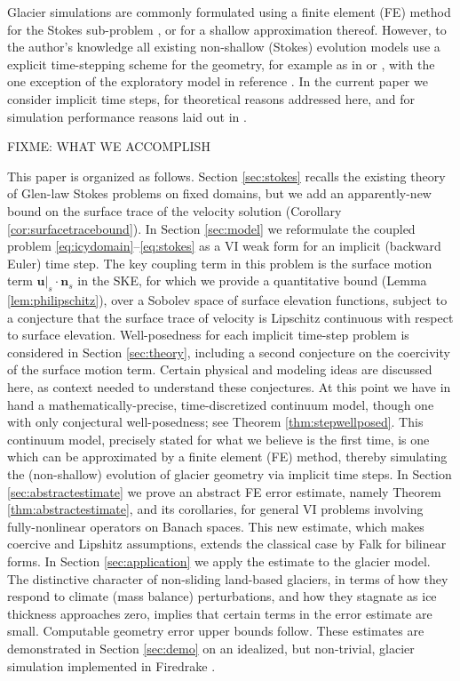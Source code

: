 \documentclass[hidelinks,onefignum,onetabnum,final]{siamart220329}  %
\newcommand{\bn}{\mathbf{n}}
\newcommand{\bu}{\mathbf{u}}
\begin{document}
Glacier simulations are commonly formulated using a finite element (FE) method for the Stokes sub-problem \cite{IsaacStadlerGhattas2015,Jouvetetal2008,Pattynetal2008}, or for a shallow approximation thereof.  However, to the author's knowledge all existing non-shallow (Stokes) evolution models use a explicit time-stepping scheme for the geometry, for example as in \cite{Jouvetetal2008} or \cite{LofgrenAhlkronaHelanow2022}, with the one exception of the exploratory model in reference \cite{WirbelJarosch2020}.  In the current paper we consider implicit time steps, for theoretical reasons addressed here, and for simulation performance reasons laid out in \cite{Bueler2023}.

FIXME: WHAT WE ACCOMPLISH

This paper is organized as follows.  Section \ref{sec:stokes} recalls the existing theory of Glen-law Stokes problems on fixed domains, but we add an apparently-new bound on the surface trace of the velocity solution (Corollary \ref{cor:surfacetracebound}).  In Section \ref{sec:model} we reformulate the coupled problem \eqref{eq:icydomain}--\eqref{eq:stokes} as a VI weak form for an implicit (backward Euler) time step.  The key coupling term in this problem is the surface motion term $\bu|_s\cdot \bn_s$ in the SKE, for which we provide a quantitative bound (Lemma \ref{lem:philipschitz}), over a Sobolev space of surface elevation functions, subject to a conjecture that the surface trace of velocity is Lipschitz continuous with respect to surface elevation.  Well-posedness for each implicit time-step problem is considered in Section \ref{sec:theory}, including a second conjecture on the coercivity of the surface motion term.  Certain physical and modeling ideas are discussed here, as context needed to understand these conjectures.  At this point we have in hand a mathematically-precise, time-discretized continuum model, though one with only conjectural well-posedness; see Theorem \ref{thm:stepwellposed}.  This continuum model, precisely stated for what we believe is the first time, is one which can be approximated by a finite element (FE) method, thereby simulating the (non-shallow) evolution of glacier geometry via implicit time steps.  In Section \ref{sec:abstractestimate} we prove an abstract FE error estimate, namely Theorem \ref{thm:abstractestimate}, and its corollaries, for general VI problems involving fully-nonlinear operators on Banach spaces.  This new estimate, which makes coercive and Lipshitz assumptions, extends the classical case by Falk \cite{Falk1974} for bilinear forms.  In Section \ref{sec:application} we apply the estimate to the glacier model.  The distinctive character of non-sliding land-based glaciers, in terms of how they respond to climate (mass balance) perturbations, and how they stagnate as ice thickness approaches zero, implies that certain terms in the error estimate are small.  Computable geometry error upper bounds follow.  These estimates are demonstrated in Section \ref{sec:demo} on an idealized, but non-trivial, glacier simulation implemented in Firedrake \cite{Hametal2023}.
\end{document}

